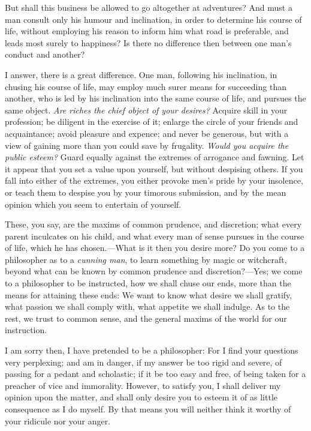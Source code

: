 But shall this business be allowed to go altogether at adventures? And
must a man consult only his humour and  inclination, in
order to determine his course of life, without employing his reason to
inform him what road is preferable, and leads most surely to
happiness? Is there no difference then between one man's conduct and
another?

I answer, there is a great difference. One man, following his
inclination, in chusing his course of life, may employ much surer
means for succeeding than another, who is led by his inclination into
the same course of life, and pursues the same object. \textit{Are
riches the chief object of your desires?} Acquire skill in your
profession; be diligent in the exercise of it; enlarge the circle of
your friends and acquaintance; avoid pleasure and expence; and never
be generous, but with a view of gaining more than you could save by
frugality. \textit{Would you acquire the public esteem?} Guard equally
against the extremes of arrogance and fawning. Let it appear that you
set a value upon yourself, but without despising others. If you fall
into either of the extremes, you either provoke men's pride by your
insolence, or teach them to despise you by your timorous submission,
and by the mean opinion which you seem to entertain of yourself.

These, you say, are the maxims of common prudence, and discretion;
what every parent inculcates on his child, and what every man of sense
pursues in the course of life, which he has chosen.---What is it then
you desire more? Do you come to a philosopher as to a \textit{cunning
man}, to learn something by magic or witchcraft, beyond what can be
known by common prudence and discretion?---Yes; we come to a
philosopher to be instructed, how we shall chuse our ends, more than
the means for attaining these ends: We want to know what desire we
shall gratify, what passion we shall comply with, what appetite we
shall indulge. As to the rest, we trust to common sense, and the
general maxims of the world for our instruction.

I am sorry then, I have pretended to be a philosopher: For I find your
questions very perplexing; and am in danger, if my answer be too rigid
and severe, of passing for a pedant and scholastic; if it be too easy
and free, of being taken for a preacher of vice and immorality.
However, to satisfy you, I shall deliver my opinion upon the matter,
and shall only desire you to esteem it of as little consequence as I
do myself. By that means you will neither think it worthy of your
ridicule nor your anger.

